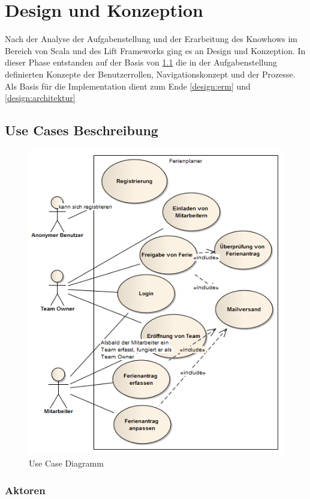 \chapter{Design und Konzeption}
Nach der Analyse der Aufgabenstellung und der Erarbeitung des Knowhows im Bereich von Scala und des Lift Frameworks ging es an Design und Konzeption. In dieser Phase entstanden auf der Basis von \ref{konzept:usecase}  die in der Aufgabenstellung definierten Konzepte der Benutzerrollen, Navigationskonzept und der Prozesse. Als Basis f\"ur die Implementation dient zum Ende \ref{design:erm}  und \ref{design:architektur} 
\section{Use Cases Beschreibung}\label{konzept:usecase}
 \begin{figure}[H]
  	\centering
    	\includegraphics[width=13cm]{images/usecases}
 	\caption{Use Case Diagramm}
\end{figure}
\subsection{Aktoren}
